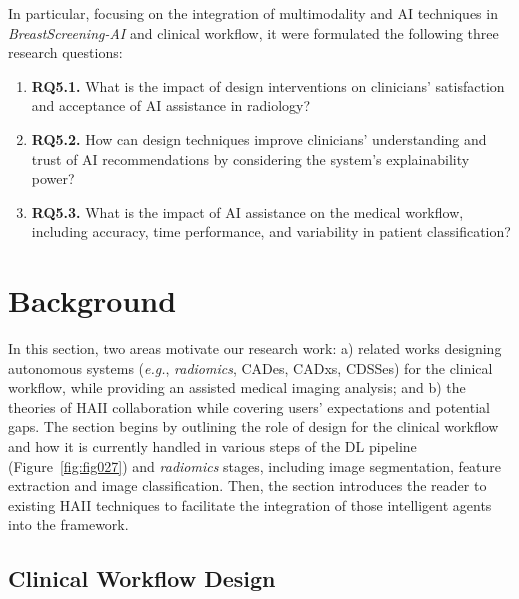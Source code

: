 \vspace{2.50mm}

\noindent
In particular, focusing on the integration of multimodality and \ac{AI} techniques in {\it BreastScreening-AI} and clinical workflow, it were formulated the following three research questions:

\vspace{0.05mm}

\begin{enumerate}
\item {\bf RQ5.1.} What is the impact of design interventions on clinicians' satisfaction and acceptance of \ac{AI} assistance in radiology?
\item {\bf RQ5.2.} How can design techniques improve clinicians' understanding and trust of \ac{AI} recommendations by considering the system's explainability power?
\item {\bf RQ5.3.} What is the impact of \ac{AI} assistance on the medical workflow, including accuracy, time performance, and variability in patient classification?
\end{enumerate}

\section{Background}
\label{sec:chap005002}

In this section, two areas motivate our research work:
a) related works designing autonomous systems ({\it e.g.}, {\it radiomics}, \acp{CADe}, \acp{CADx}, \acp{CDSSe}) for the clinical workflow, while providing an assisted medical imaging analysis; and
b) the theories of \ac{HAII} collaboration while covering users' expectations and potential gaps.
The section begins by outlining the role of design for the clinical workflow and how it is currently handled in various steps of the \ac{DL} pipeline (Figure~\ref{fig:fig027}) and {\it radiomics} stages, including image segmentation, feature extraction and image classification.
Then, the section introduces the reader to existing \ac{HAII} techniques to facilitate the integration of those intelligent agents into the framework.

\subsection{Clinical Workflow Design}
\label{sec:chap005002001}

